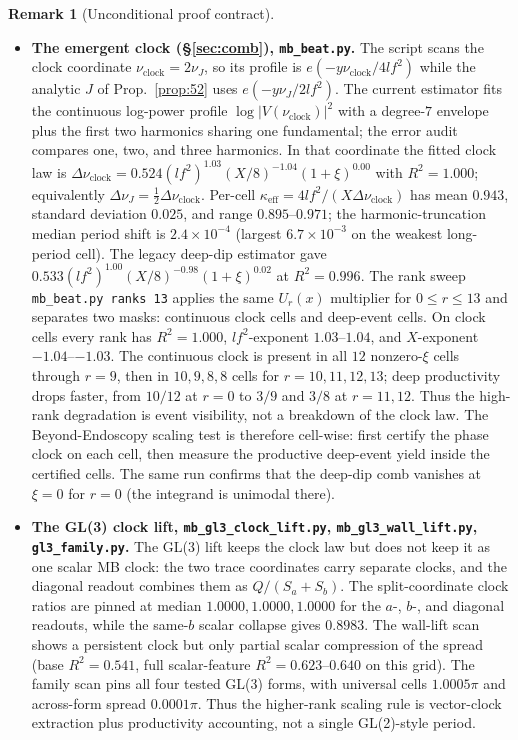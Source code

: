 \documentclass[11pt]{article}
\theoremstyle{definition}
\newtheorem{remark}[theorem]{Remark}
\begin{document}
\begin{remark}[Unconditional proof contract]
\begin{enumerate}
\begin{itemize}
\item \textbf{The emergent clock (\S\ref{sec:comb}), \texttt{mb\_beat.py}.} The script scans the clock
coordinate $\nu_{\mathrm{clock}}=2\nu_J$, so its profile is
$e(-y\nu_{\mathrm{clock}}/4lf^2)$ while the analytic $J$ of Prop.~\ref{prop:52} uses
$e(-y\nu_J/2lf^2)$. The current estimator fits the continuous log-power profile
$\log|V(\nu_{\mathrm{clock}})|^2$ with a degree-$7$ envelope plus the first two harmonics sharing one
fundamental; the error audit compares one, two, and three harmonics. In that coordinate the fitted
clock law is
$\Delta\nu_{\mathrm{clock}}=0.524(lf^2)^{1.03}(X/8)^{-1.04}(1+\xi)^{0.00}$ with $R^2=1.000$; equivalently
$\Delta\nu_J=\tfrac12\Delta\nu_{\mathrm{clock}}$. Per-cell
$\kappa_{\mathrm{eff}}=4lf^2/(X\Delta\nu_{\mathrm{clock}})$ has mean $0.943$, standard deviation $0.025$,
and range $0.895$--$0.971$; the harmonic-truncation median period shift is $2.4\times10^{-4}$ (largest
$6.7\times10^{-3}$ on the weakest long-period cell). The legacy deep-dip estimator gave
$0.533(lf^2)^{1.00}(X/8)^{-0.98}(1+\xi)^{0.02}$ at $R^2=0.996$. The rank sweep
\texttt{mb\_beat.py ranks 13} applies the same $U_r(x)$ multiplier for $0\le r\le13$ and separates two masks:
continuous clock cells and deep-event cells. On clock cells every rank has $R^2=1.000$, $lf^2$-exponent
$1.03$--$1.04$, and $X$-exponent $-1.04$--$-1.03$. The continuous clock is present in all $12$ nonzero-$\xi$
cells through $r=9$, then in $10,9,8,8$ cells for $r=10,11,12,13$; deep productivity drops faster, from
$10/12$ at $r=0$ to $3/9$ and $3/8$ at $r=11,12$. Thus the high-rank degradation is event visibility, not a
breakdown of the clock law. The Beyond-Endoscopy scaling test is therefore cell-wise: first certify the
phase clock on each cell, then measure the productive deep-event yield inside the certified cells. The same run confirms that the deep-dip comb vanishes at $\xi=0$ for $r=0$
(the integrand is unimodal there).

\item \textbf{The GL(3) clock lift, \texttt{mb\_gl3\_clock\_lift.py},
\texttt{mb\_gl3\_wall\_lift.py}, \texttt{gl3\_family.py}.} The GL(3) lift keeps the clock law but
does not keep it as one scalar MB clock: the two trace coordinates carry separate clocks, and the diagonal
readout combines them as $Q/(S_a+S_b)$. The split-coordinate clock ratios are pinned at median
$1.0000,1.0000,1.0000$ for the $a$-, $b$-, and diagonal readouts, while the same-$b$ scalar collapse gives
$0.8983$. The wall-lift scan shows a persistent clock but only partial scalar compression of the spread
(base $R^2=0.541$, full scalar-feature $R^2=0.623$--$0.640$ on this grid). The family scan pins all four
tested GL(3) forms, with universal cells $1.0005\pi$ and across-form spread $0.0001\pi$. Thus the higher-rank
scaling rule is vector-clock extraction plus productivity accounting, not a single GL(2)-style period.


\end{itemize}
\end{enumerate}
\end{remark}
\end{document}
